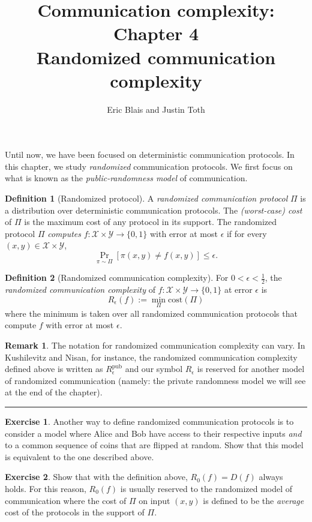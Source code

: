 \documentclass[11pt]{amsart}
\title{Communication complexity: Chapter 4 \\ Randomized communication complexity}
\author{Eric Blais and Justin Toth}
\theoremstyle{plain}
\theoremstyle{definition}
\newtheorem{definition}{Definition}
\newtheorem{exercise}{Exercise}
\newtheorem{remark}{Remark}
\theoremstyle{plain}
\newcommand{\calX}{\mathcal{X}}
\newcommand{\calY}{\mathcal{Y}}
\newcommand{\cost}{\mathrm{cost}}
\newcommand{\exercises}{\bigskip \noindent\rule{8cm}{0.4pt} \medskip}
\begin{document}
\maketitle

Until now, we have been focused on deterministic communication protocols. In this chapter, we study \emph{randomized} communication protocols. We first focus on what is known as the \emph{public-randomness model} of communication. 

\begin{definition}[Randomized protocol]
A \emph{randomized communication protocol} $\Pi$ is a distribution over deterministic communication protocols. The \emph{(worst-case) cost} of $\Pi$ is the maximum cost of any protocol in its support. The randomized protocol $\Pi$ \emph{computes} $f : \calX \times \calY \to \{0,1\}$ with error at most $\epsilon$ if for every $(x,y) \in \calX \times \calY$,
\[
\Pr_{\pi \sim \Pi}[ \pi(x,y) \neq f(x,y) ] \le \epsilon.
\]
\end{definition}


\begin{definition}[Randomized communication complexity]
For $0 < \epsilon < \frac12$, the \emph{randomized communication complexity} of $f : \calX \times \calY \to \{0,1\}$ at error $\epsilon$ is
\[
R_\epsilon(f) := \min_{\Pi} \cost(\Pi)
\]
where the minimum is taken over all randomized communication protocols that compute $f$ with error at most $\epsilon$.
\end{definition}

\begin{remark}
The notation for randomized communication complexity can vary. In Kushilevitz and Nisan, for instance, the randomized communication complexity defined above is written as $R^{\mathrm{pub}}_\epsilon$ and our symbol $R_\epsilon$ is reserved for another model of randomized communication (namely: the private randomness model we will see at the end of the chapter).
\end{remark}

\exercises

\begin{exercise}
Another way to define randomized communication protocols is to consider a model where Alice and Bob have access to their respective inputs \emph{and} to a common sequence of coins that are flipped at random. Show that this model is equivalent to the one described above.
\end{exercise}

\begin{exercise}
Show that with the definition above, $R_0(f) = D(f)$ always holds. For this reason, $R_0(f)$ is usually reserved to the randomized model of communication where the cost of $\Pi$ on input $(x,y)$ is defined to be the \emph{average} cost of the protocols in the support of $\Pi$.
\end{exercise}
\end{document}
